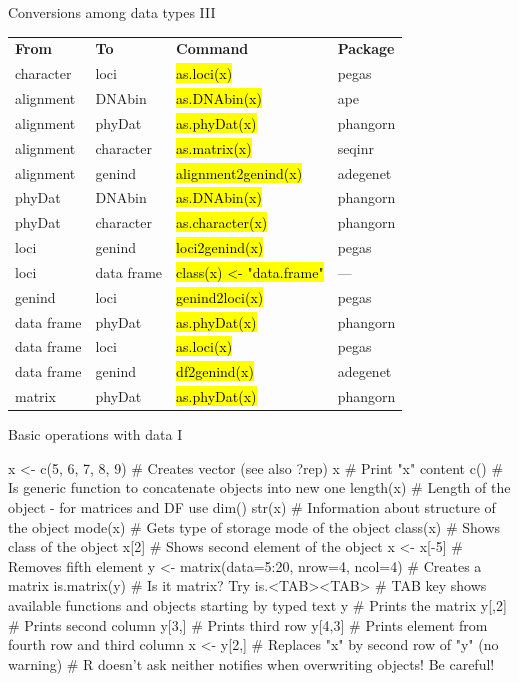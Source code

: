 \documentclass[compress, ucs, xelatex, 11pt, xcolor=svgnames,
  hyperref={
    bookmarks=true,
    unicode=true,
    colorlinks=true,
    pdftitle={Molecular data in R},
    plainpages=false,
    pdfauthor={Vojtech Zeisek},
    pdfsubject={Course about phylogeny and evolution in R},
    pdfcreator={XeLaTeX},
    pdfkeywords={R, evolution, phylogeny, molecular data},
    linkcolor=Tomato,
    anchorcolor=SaddleBrown,
    citecolor=Goldenrod,
    filecolor=DarkMagenta,
    menucolor=Sienna,
    urlcolor=DarkTurquoise,
    pdftex},
  url={hyphens, lowtilde} %
  ]{beamer}
\renewcommand{\texttt}[1]{\hl{\ttfamily #1}}
\begin{document}
\begin{frame}{Conversions among data types III}
  \begin{tabular}{llll}
    \textbf{From} & \textbf{To} & \textbf{Command} & \textbf{Package}\\
    character & loci & \texttt{as.loci(x)} & pegas\\
    alignment & DNAbin & \texttt{as.DNAbin(x)} & ape\\
    alignment & phyDat & \texttt{as.phyDat(x)} & phangorn\\
    alignment & character & \texttt{as.matrix(x)} & seqinr\\
    alignment & genind & \texttt{alignment2genind(x)} & adegenet\\
    phyDat & DNAbin & \texttt{as.DNAbin(x)} & phangorn\\
    phyDat & character & \texttt{as.character(x)} & phangorn\\
    loci & genind & \texttt{loci2genind(x)} & pegas\\
    loci & data frame & \texttt{class(x) <- "data.frame"} & --- \\
    genind & loci & \texttt{genind2loci(x)} & pegas\\
    data frame & phyDat & \texttt{as.phyDat(x)} & phangorn\\
    data frame & loci & \texttt{as.loci(x)} & pegas\\
    data frame & genind & \texttt{df2genind(x)} & adegenet\\
    matrix & phyDat & \texttt{as.phyDat(x)} & phangorn
  \end{tabular}
\end{frame}

\begin{frame}[fragile]{Basic operations with data I}
  \begin{spluscode}
    x <- c(5, 6, 7, 8, 9) # Creates vector (see also ?rep)
    x # Print "x" content
    c() # Is generic function to concatenate objects into new one
    length(x) # Length of the object - for matrices and DF use dim()
    str(x) # Information about structure of the object
    mode(x) # Gets type of storage mode of the object
    class(x) # Shows class of the object
    x[2] # Shows second element of the object
    x <- x[-5] # Removes fifth element
    y <- matrix(data=5:20, nrow=4, ncol=4) # Creates a matrix
    is.matrix(y) # Is it matrix? Try is.<TAB><TAB>
    # TAB key shows available functions and objects starting by typed text
    y # Prints the matrix
    y[,2] # Prints second column
    y[3,] # Prints third row
    y[4,3] # Prints element from fourth row and third column
    x <- y[2,] # Replaces "x" by second row of "y" (no warning)
    # R doesn't ask neither notifies when overwriting objects! Be careful!
  \end{spluscode}
\end{frame}
\end{document}
